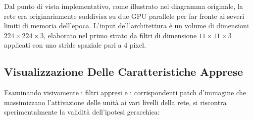 ﻿\documentclass[11pt, a4paper]{article}
\begin{document}

Dal punto di vista implementativo, come illustrato nel diagramma originale, la rete era originariamente suddivisa su due GPU parallele per far fronte ai severi limiti di memoria dell'epoca. L'input dell'architettura è un volume di dimensioni $224 \times 224 \times 3$, elaborato nel primo strato da filtri di dimensione $11 \times 11 \times 3$ applicati con uno stride spaziale pari a 4 pixel.


\newpage

\subsection{Visualizzazione Delle Caratteristiche Apprese}

Esaminando visivamente i filtri appresi e i corrispondenti patch d'immagine che massimizzano l'attivazione delle unità ai vari livelli della rete, si riscontra sperimentalmente la validità dell'ipotesi gerarchica:
\end{document}
